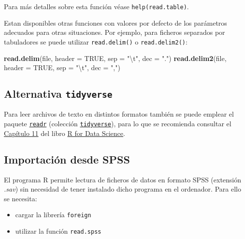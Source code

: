 \documentclass[]{book}
\newenvironment{Shaded}{\begin{snugshade}}{\end{snugshade}}
\newcommand{\KeywordTok}[1]{\textcolor[rgb]{0.13,0.29,0.53}{\textbf{#1}}}
\newcommand{\DataTypeTok}[1]{\textcolor[rgb]{0.13,0.29,0.53}{#1}}
\newcommand{\CharTok}[1]{\textcolor[rgb]{0.31,0.60,0.02}{#1}}
\newcommand{\StringTok}[1]{\textcolor[rgb]{0.31,0.60,0.02}{#1}}
\newcommand{\OtherTok}[1]{\textcolor[rgb]{0.56,0.35,0.01}{#1}}
\newcommand{\NormalTok}[1]{#1}
\begin{document}
Para más detalles sobre esta función véase \texttt{help(read.table)}.

Estan disponibles otras funciones con valores por defecto de los
parámetros adecuados para otras situaciones. Por ejemplo, para ficheros
separados por tabuladores se puede utilizar \texttt{read.delim()} o
\texttt{read.delim2()}:

\begin{Shaded}
\begin{Highlighting}[]
\KeywordTok{read.delim}\NormalTok{(file, }\DataTypeTok{header =} \OtherTok{TRUE}\NormalTok{, }\DataTypeTok{sep =} \StringTok{"}\CharTok{\textbackslash{}t}\StringTok{"}\NormalTok{, }\DataTypeTok{dec =} \StringTok{"."}\NormalTok{)}
\KeywordTok{read.delim2}\NormalTok{(file, }\DataTypeTok{header =} \OtherTok{TRUE}\NormalTok{, }\DataTypeTok{sep =} \StringTok{"}\CharTok{\textbackslash{}t}\StringTok{"}\NormalTok{, }\DataTypeTok{dec =} \StringTok{","}\NormalTok{)}
\end{Highlighting}
\end{Shaded}

\subsection{\texorpdfstring{Alternativa
\texttt{tidyverse}}{Alternativa tidyverse}}\label{alternativa-tidyverse}

Para leer archivos de texto en distintos formatos también se puede
emplear el paquete \href{https://readr.tidyverse.org}{\texttt{readr}}
(colección \href{https://www.tidyverse.org/}{\texttt{tidyverse}}), para
lo que se recomienda consultar el
\href{https://r4ds.had.co.nz/data-import.html}{Capítulo 11} del libro
\href{http://r4ds.had.co.nz}{R for Data Science}.

\subsection{Importación desde SPSS}\label{importaciuxf3n-desde-spss}

El programa R permite lectura de ficheros de datos en formato SPSS
(extensión \emph{.sav}) sin necesidad de tener instalado dicho programa
en el ordenador. Para ello se necesita:

\begin{itemize}
\item
  cargar la librería \texttt{foreign}
\item
  utilizar la función \texttt{read.spss}
\end{itemize}
\end{document}
